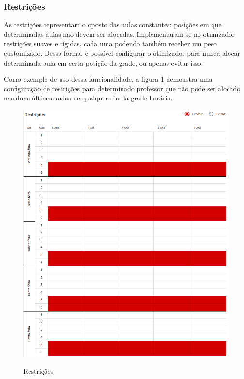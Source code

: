 \subsubsection{Restrições}

As restrições representam o oposto das aulas constantes: posições em que determinadas aulas não devem ser alocadas. Implementaram-se no otimizador restrições suaves e rígidas, cada uma podendo também receber um peso customizado. Dessa forma, é possível configurar o otimizador para nunca alocar determinada aula em certa posição da grade, ou apenas evitar isso.

Como exemplo de uso dessa funcionalidade, a figura \ref{fig:restricoes} demonstra uma configuração de restrições para determinado professor que não pode ser alocado nas duas últimas aulas de qualquer dia da grade horária.

\begin{figure}[!htb]
	\centering
	\caption{Restrições}
	\includegraphics[width=1\textwidth]{./dados/figuras/restricoes}
	\label{fig:restricoes}
\end{figure}
\pagebreak


